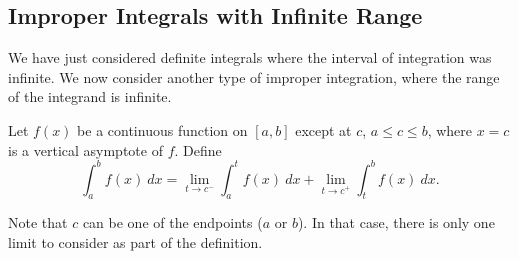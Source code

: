 \subsection*{Improper Integrals with Infinite Range}

We have just considered definite integrals where the interval of integration was infinite. We now consider another type of improper integration, where the range of the integrand is infinite.


{Let $f(x)$ be a continuous function on $[a,b]$ except at $c$, $a\leq c\leq b$, where $x=c$ is a vertical asymptote of $f$. Define
$$\int_a^b f(x)\ dx = \lim_{t\to c^-}\int_a^t f(x)\ dx + \lim_{t\to c^+}\int_t^b f(x)\ dx.$$
}

Note that $c$ can be one of the endpoints ($a$ or $b$). In that case, there is only one limit to consider as part of the definition.


